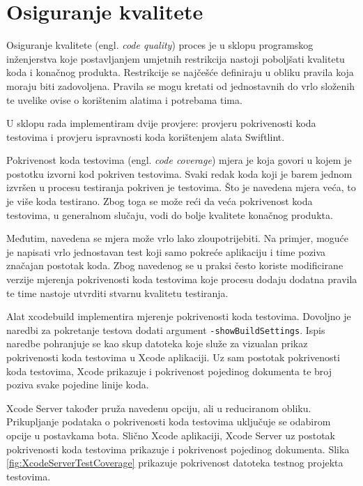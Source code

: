 \documentclass[times, utf8, diplomski, numeric]{fer}
\newcommand{\eng}[1]{(engl. \textit{#1})}
\begin{document}
\section{Osiguranje kvalitete}

Osiguranje kvalitete \eng{code quality} proces je u sklopu programskog inženjerstva koje postavljanjem umjetnih restrikcija nastoji poboljšati kvalitetu koda i konačnog produkta. Restrikcije se najčešće definiraju u obliku pravila koja moraju biti zadovoljena. Pravila se mogu kretati od jednostavnih do vrlo složenih te uvelike ovise o korištenim alatima i potrebama tima.

U sklopu rada implementiram dvije provjere: provjeru pokrivenosti koda testovima i provjeru ispravnosti koda korištenjem alata Swiftlint.

Pokrivenost koda testovima \eng{code coverage} mjera je koja govori u kojem je postotku izvorni kod pokriven testovima. Svaki redak koda koji je barem jednom izvršen u procesu testiranja pokriven je testovima. Što je navedena mjera veća, to je više koda testirano. Zbog toga se može reći da veća pokrivenost koda testovima, u generalnom slučaju, vodi do bolje kvalitete konačnog produkta.

Međutim, navedena se mjera može vrlo lako zloupotrijebiti. Na primjer, moguće je napisati vrlo jednostavan test koji samo pokreće aplikaciju i time poziva značajan postotak koda. Zbog navedenog se u praksi često koriste modificirane verzije mjerenja pokrivenosti koda testovima koje procesu dodaju dodatna pravila te time nastoje utvrditi stvarnu kvalitetu testiranja\citep{wiki:CodeCoverage}.

Alat xcodebuild implementira mjerenje pokrivenosti koda testovima. Dovoljno je naredbi za pokretanje testova dodati argument \verb|-showBuildSettings|. Ispis naredbe pohranjuje se kao skup datoteka koje služe za vizualan prikaz pokrivenosti koda testovima u Xcode aplikaciji. Uz sam postotak pokrivenosti koda testovima, Xcode prikazuje i pokrivenost pojedinog dokumenta te broj poziva svake pojedine linije koda.

Xcode Server također pruža navedenu opciju, ali u reduciranom obliku. Prikupljanje podataka o pokrivenosti koda testovima uključuje se odabirom opcije  u postavkama bota. Slično Xcode aplikaciji, Xcode Server uz postotak pokrivenosti koda testovima prikazuje i pokrivenost pojedinog dokumenta. Slika \ref{fig:XcodeServerTestCoverage} prikazuje pokrivenost datoteka testnog projekta testovima.
\end{document}
